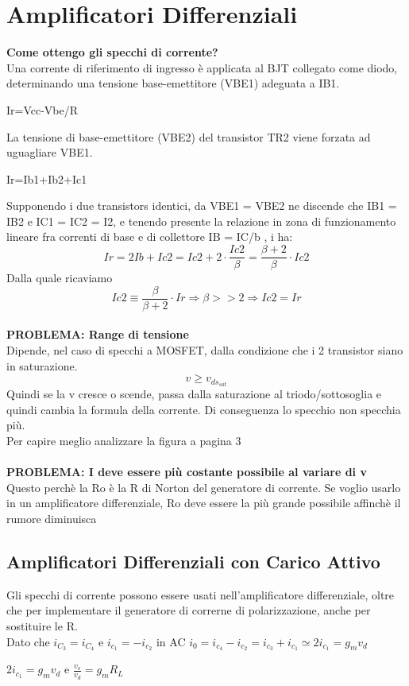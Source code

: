 \documentclass{article}
\begin{document}
\section{Amplificatori Differenziali}

\textbf{Come ottengo gli specchi di corrente?} \\
Una corrente di riferimento di ingresso è applicata al BJT collegato come diodo, determinando una tensione base-emettitore (VBE1) adeguata a IB1.
\begin{center}
    Ir={Vcc-Vbe/R}
\end{center} 
La tensione di base-emettitore (VBE2) del transistor TR2 viene forzata ad uguagliare VBE1.
\begin{center}
    Ir={Ib1+Ib2+Ic1}  
\end{center}
Supponendo i due transistors identici, da VBE1 = VBE2 ne discende che IB1 = IB2 e IC1 = IC2 = I2, e tenendo presente la relazione in zona di funzionamento lineare fra correnti di base e di collettore IB = IC/b , i ha: 
\begin{equation}
    Ir=2Ib+Ic2=Ic2+2\cdot\frac{Ic2}{\beta} = \frac{\beta + 2}{\beta}\cdot Ic2 
\end{equation}
Dalla quale ricaviamo 
\begin{equation}
    Ic2\equiv{\frac{\beta}{\beta+2}\cdot Ir} \Rightarrow \beta >> 2 \Rightarrow Ic2={Ir}
\end{equation} \\
\textbf{PROBLEMA: Range di tensione} \\
Dipende, nel caso di specchi a MOSFET, dalla condizione che i 2 transistor siano in saturazione.
\begin{equation}
    v \geq v_{ds_{sat}}
\end{equation}
Quindi se la v cresce o scende, passa dalla saturazione al triodo/sottosoglia e quindi cambia la formula della corrente. Di conseguenza lo specchio non specchia più. \\ 
Per capire meglio analizzare la figura a pagina 3 \\ \\
\textbf{PROBLEMA: I deve essere più costante possibile al variare di v }\\
Questo perchè la R{o} è la R di Norton del generatore di corrente.
Se voglio usarlo in un amplificatore differenziale, R{o}  deve essere la più grande possibile affinchè il rumore diminuisca 

\subsection{Amplificatori Differenziali con Carico Attivo}
Gli specchi di corrente possono essere usati nell'amplificatore differenziale, oltre che per implementare il generatore di correrne di polarizzazione, anche per sostituire le R.\\
Dato che $i_{C_{3}}=i_{C_{4}}$ e $i_{c_{1}}=-i_{c_{2}}$ in AC
$i_{0}=i_{c_{4}}-i_{c_{2}}=i_{c_{3}}+i_{c_{1}}\simeq2i_{c_{1}}=g_{m}v_{d}$ \\
\begin{center}
    $2i_{c_{1}}=g_{m}v_{d}$  e  $\frac{v_{o}}{v_{d}}=g_{m}R_{L}$
\end{center}
\end{document}
